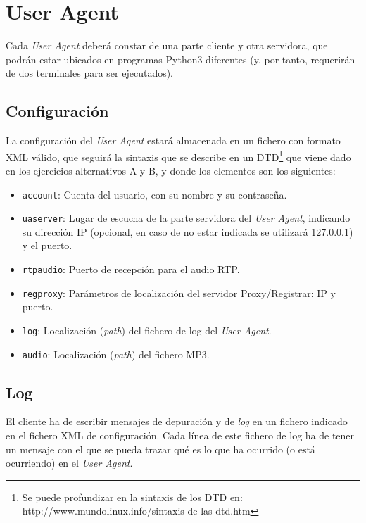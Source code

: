 \documentclass[a4paper,11pt]{article}
\begin{document}
\section{User Agent}

Cada \emph{User Agent} deberá constar de una parte cliente y otra servidora, que podrán estar ubicados en programas Python3 diferentes (y, por tanto, requerirán de dos terminales para ser ejecutados).

\subsection{Configuración}

La configuración del \emph{User Agent} estará almacenada en un fichero
con formato XML válido, que seguirá 
la sintaxis que se describe en un DTD\footnote{Se puede profundizar en la sintaxis de los DTD en: http://www.mundolinux.info/sintaxis-de-las-dtd.htm} que viene dado en los ejercicios alternativos A y B, y donde los elementos son los siguientes:

\begin{itemize}
  \item \texttt{account}: Cuenta del usuario, con su nombre y su contraseña.
  \item \texttt{uaserver}: Lugar de escucha de la parte servidora del \emph{User Agent}, indicando su dirección IP (opcional, en caso de no estar indicada se utilizará 127.0.0.1) y el puerto.
  \item \texttt{rtpaudio}: Puerto de recepción para el audio RTP.
  \item \texttt{regproxy}: Parámetros de localización del servidor Proxy/Registrar: IP y puerto.
  \item \texttt{log}: Localización (\emph{path}) del fichero de log del \emph{User Agent}.
  \item \texttt{audio}: Localización (\emph{path}) del fichero MP3.
\end{itemize}

\subsection{Log}

El cliente ha de escribir mensajes de depuración y de \emph{log} en un fichero indicado en el fichero XML de configuración. Cada línea de este fichero de log ha de tener un mensaje con el que se pueda trazar qué es lo que ha ocurrido (o está ocurriendo) en el \emph{User Agent}.
\end{document}
